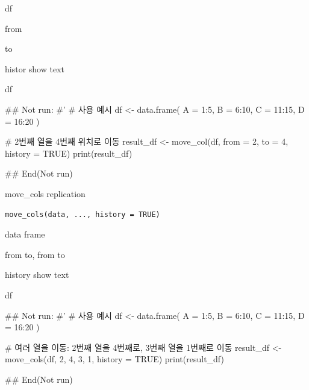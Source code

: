 \documentclass[a4paper]{book}
\begin{document}
%
\begin{Arguments}
\begin{ldescription}
\item[\code{data}] df

\item[\code{from}] from

\item[\code{to}] to

\item[\code{history}] histor show text
\end{ldescription}
\end{Arguments}
%
\begin{Value}
df
\end{Value}
%
\begin{Examples}
\begin{ExampleCode}
\#\# Not run: 
#'
# 사용 예시
df <- data.frame(
  A = 1:5,
  B = 6:10,
  C = 11:15,
  D = 16:20
)

# 2번째 열을 4번째 위치로 이동
result_df <- move_col(df, from = 2, to = 4, history = TRUE)
print(result_df)


## End(Not run)

\end{ExampleCode}
\end{Examples}
%
\begin{Description}
move\_cols replication
\end{Description}
%
\begin{Usage}
\begin{verbatim}
move_cols(data, ..., history = TRUE)
\end{verbatim}
\end{Usage}
%
\begin{Arguments}
\begin{ldescription}
\item[\code{data}] data frame

\item[\code{...}] from to, from to

\item[\code{history}] history show text
\end{ldescription}
\end{Arguments}
%
\begin{Value}
df
\end{Value}
%
\begin{Examples}
\begin{ExampleCode}
\#\# Not run: 
#'
# 사용 예시
df <- data.frame(
  A = 1:5,
  B = 6:10,
  C = 11:15,
  D = 16:20
)

# 여러 열을 이동: 2번째 열을 4번째로, 3번째 열을 1번째로 이동
result_df <- move_cols(df, 2, 4, 3, 1, history = TRUE)
print(result_df)


## End(Not run)

\end{ExampleCode}
\end{Examples}
\end{document}
